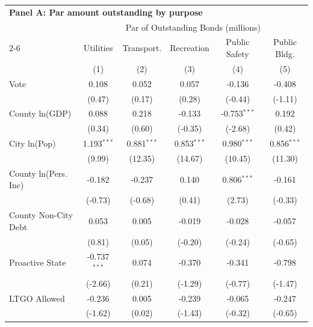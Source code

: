 \begingroup
\centering
\begin{tabular*}{\textwidth}{@{\extracolsep{\fill}}lccccc}
\multicolumn{6}{l}{\textbf{Panel A: Par amount outstanding by purpose}}\\

\addlinespace
   \toprule
    & \multicolumn{5}{c}{Par of Outstanding Bonds (millions)}\\
   \cmidrule(lr){2-6}
                        & Utilities      & Transport.    & Recreation    & Public Safety  & Public Bldg. \\   
                        & (1)            & (2)           & (3)           & (4)            & (5)\\  
   \midrule 
   Vote                 & 0.108          & 0.052         & 0.057         & -0.136         & -0.408\\   
                        & (0.47)        & (0.17)       & (0.28)       & (-0.44)       & (-1.11)\\   
   County ln(GDP)       & 0.088          & 0.218         & -0.133        & -0.753$^{***}$ & 0.192\\   
                        & (0.34)        & (0.60)       & (-0.35)      & (-2.68)       & (0.42)\\   
   City ln(Pop)         & 1.193$^{***}$  & 0.881$^{***}$ & 0.853$^{***}$ & 0.980$^{***}$  & 0.856$^{***}$\\   
                        & (9.99)        & (12.35)      & (14.67)      & (10.45)       & (11.30)\\   
   County ln(Pers. Inc) & -0.182         & -0.237        & 0.140         & 0.806$^{***}$  & -0.161\\   
                        & (-0.73)       & (-0.68)      & (0.41)       & (2.73)        & (-0.33)\\   
   County Non-City Debt & 0.053          & 0.005         & -0.019        & -0.028         & -0.057\\   
                        & (0.81)        & (0.05)       & (-0.20)      & (-0.24)       & (-0.65)\\   
   Proactive State      & -0.737$^{***}$ & 0.074         & -0.370        & -0.341         & -0.798\\   
                        & (-2.66)       & (0.21)       & (-1.29)      & (-0.77)       & (-1.47)\\   
   LTGO Allowed         & -0.236         & 0.005         & -0.239        & -0.065         & -0.247\\   
                        & (-1.62)       & (0.02)       & (-1.43)      & (-0.32)       & (-0.65)\\   

\end{tabular*}
